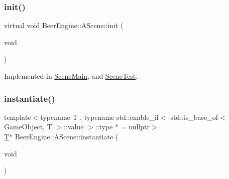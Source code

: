 \mbox{\label{class_beer_engine_1_1_a_scene_a7a55b4e506ae618e6596ae812ad48db0}} 
\subsubsection{\texorpdfstring{init()}{init()}}
{\footnotesize\ttfamily virtual void Beer\+Engine\+::\+A\+Scene\+::init (\begin{DoxyParamCaption}\item[{void}]{ }\end{DoxyParamCaption})\hspace{0.3cm}{\ttfamily [pure virtual]}}



Implemented in \mbox{\hyperlink{class_scene_main_a4406dc5cf9807edcf360ba416de928e2}{Scene\+Main}}, and \mbox{\hyperlink{class_scene_test_aedded03410798c3705fb3fb028e56ab5}{Scene\+Test}}.

\mbox{\label{class_beer_engine_1_1_a_scene_a2bd087ae22796d1e286c867f4f1ecc38}} 
\subsubsection{\texorpdfstring{instantiate()}{instantiate()}\hspace{0.1cm}{\footnotesize\ttfamily [1/2]}}
{\footnotesize\ttfamily template$<$typename T , typename std\+::enable\+\_\+if$<$ std\+::is\+\_\+base\+\_\+of$<$ Game\+Object, T $>$\+::value $>$\+::type $\ast$  = nullptr$>$ \\
\mbox{\hyperlink{namespace_beer_engine_a94f0b552f6dc910de8cdb44207981f53a8de48e594408f9fc561b2f68ce05f664}{T}}$\ast$ Beer\+Engine\+::\+A\+Scene\+::instantiate (\begin{DoxyParamCaption}\item[{void}]{ }\end{DoxyParamCaption})\hspace{0.3cm}{\ttfamily [inline]}}

\mbox{\label{class_beer_engine_1_1_a_scene_acf89d3198589c3e3007b0bc0579dd9ab}} 
